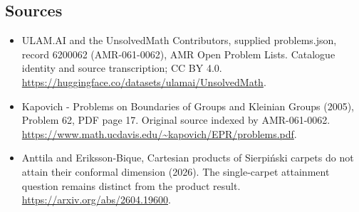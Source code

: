 \documentclass[11pt,a4paper]{article}
\begin{document}
\subsection{Sources}
\begin{itemize}
\item[S1] ULAM.AI and the UnsolvedMath Contributors, supplied problems.json, record 6200062 (AMR-061-0062), AMR Open Problem Lists. Catalogue identity and source transcription; CC BY 4.0.
\url{https://huggingface.co/datasets/ulamai/UnsolvedMath}.
\item[S2] Kapovich - Problems on Boundaries of Groups and Kleinian Groups (2005), Problem 62, PDF page 17. Original source indexed by AMR-061-0062.
\url{https://www.math.ucdavis.edu/~kapovich/EPR/problems.pdf}.
\item[S3] Anttila and Eriksson-Bique, Cartesian products of Sierpiński carpets do not attain their conformal dimension (2026). The single-carpet attainment question remains distinct from the product result.
\url{https://arxiv.org/abs/2604.19600}.
\end{itemize}
\end{document}

